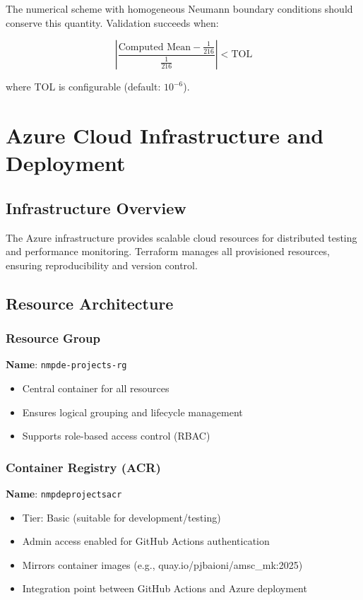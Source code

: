 \documentclass[11pt,a4paper]{article}
\begin{document}
The numerical scheme with homogeneous Neumann boundary conditions should conserve this quantity. Validation succeeds when:

\[
\left|\frac{\text{Computed Mean} - \frac{1}{216}}{\frac{1}{216}}\right| < \text{TOL}
\]

where TOL is configurable (default: $10^{-6}$).

\newpage

\section{Azure Cloud Infrastructure and Deployment}

\subsection{Infrastructure Overview}
The Azure infrastructure provides scalable cloud resources for distributed testing and performance monitoring. Terraform manages all provisioned resources, ensuring reproducibility and version control.

\subsection{Resource Architecture}

\subsubsection{Resource Group}
\textbf{Name}: \texttt{nmpde-projects-rg}
\begin{itemize}
    \item Central container for all resources
    \item Ensures logical grouping and lifecycle management
    \item Supports role-based access control (RBAC)
\end{itemize}

\subsubsection{Container Registry (ACR)}
\textbf{Name}: \texttt{nmpdeprojectsacr}
\begin{itemize}
    \item Tier: Basic (suitable for development/testing)
    \item Admin access enabled for GitHub Actions authentication
    \item Mirrors container images (e.g., quay.io/pjbaioni/amsc\_mk:2025)
    \item Integration point between GitHub Actions and Azure deployment
\end{itemize}
\end{document}
